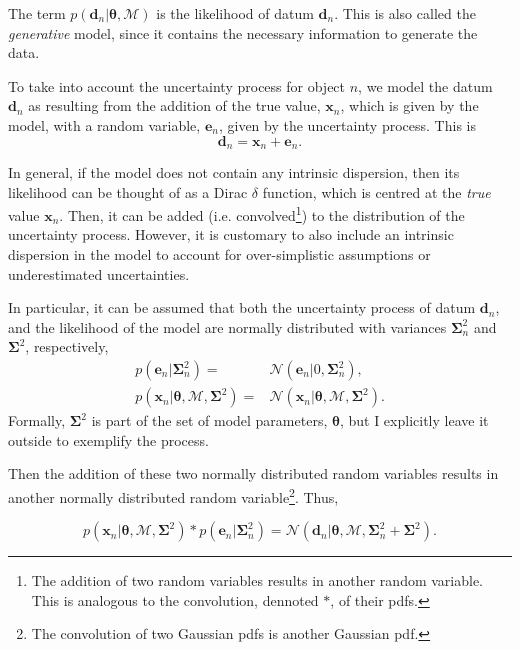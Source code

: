The term $p(\mathbf{d}_n|\boldsymbol{\theta},\mathcal{M})$ is the likelihood of datum $\mathbf{d}_n$. This is also called the \emph{generative} model, since it contains the necessary information to generate the data. 


To take into account the uncertainty process for object $n$, we model the datum $\mathbf{d}_n$ as resulting from the addition of the true value, $\mathbf{x}_n$, which is given by the model, with a random variable, $\mathbf{e}_n$, given by the uncertainty process. This is
\begin{equation}
\mathbf{d}_n = \mathbf{x}_n + \mathbf{e}_n. \nonumber
\end{equation}

In general, if the model does not contain any intrinsic dispersion, then its likelihood can be thought of as a Dirac $\delta$ function, which is centred at the \emph{true} value $\mathbf{x}_n$. Then, it can be added (i.e. convolved\footnote{The addition of two random variables results in another random variable. This is analogous  to the convolution, dennoted $*$, of their \glspl{pdf}.}) to the distribution of the uncertainty process. However, it is customary to also include an intrinsic dispersion in the model to account for over-simplistic assumptions or underestimated uncertainties. 

In particular, it can be assumed that both the uncertainty process of datum $\mathbf{d}_n$, and the likelihood of the model are normally distributed with variances $\boldsymbol{\Sigma}_n^2$ and $\boldsymbol{\Sigma}^2$, respectively, 
\begin{align}
p(\mathbf{e}_n|\mathbf{\Sigma}_n^2)= &\mathcal{N}(\mathbf{e}_n|0,\boldsymbol{\Sigma}_n^2), \nonumber\\
p(\mathbf{x}_n|\boldsymbol{\theta},\mathcal{M},\mathbf{\Sigma}^2)= &\mathcal{N}(\mathbf{x}_n|\boldsymbol{\theta},\mathcal{M},\boldsymbol{\Sigma}^2).\nonumber
\end{align}
Formally, $\boldsymbol{\Sigma}^2$ is part of the set of model parameters, $\boldsymbol{\theta}$, but I explicitly leave it outside to exemplify the process. 

Then the addition of these two normally distributed random variables results in another normally distributed random variable\footnote{The convolution of two Gaussian \glspl{pdf}  is another Gaussian \gls{pdf}.}. Thus,

\begin{equation}
p(\mathbf{x}_n|\boldsymbol{\theta},\mathcal{M},\boldsymbol{\Sigma}^2)*p(\mathbf{e}_n|\boldsymbol{\Sigma}_n^2) = \mathcal{N}(\mathbf{d}_n|\boldsymbol{\theta},\mathcal{M},\boldsymbol{\Sigma}_n^2+\boldsymbol{\Sigma}^2).
\end{equation}

